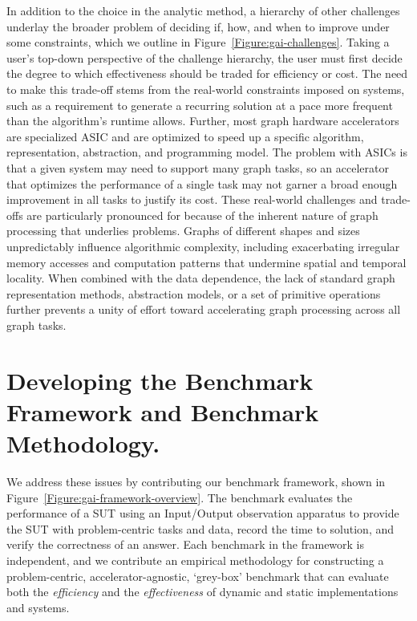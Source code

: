 In addition to the choice in the analytic method, a hierarchy of other challenges underlay the broader problem of deciding if, how, and when to improve \gai under some constraints, which we outline in Figure~\ref{Figure:gai-challenges}.
Taking a user's top-down perspective of the challenge hierarchy, the user must first decide the degree to which effectiveness should be traded for efficiency or cost.
The need to make this trade-off stems from the real-world constraints imposed on \gai systems, such as a requirement to generate a recurring solution at a pace more frequent than the algorithm's runtime allows.
Further, most graph hardware accelerators are specialized \ac{ASIC} and are optimized to speed up a specific algorithm, representation, abstraction, and programming model.
The problem with \ac{ASIC}s is that a given \gai system may need to support many graph tasks, so an accelerator that optimizes the performance of a single \gai task may not garner a broad enough improvement in all \gai tasks to justify its cost. 
These real-world challenges and trade-offs are particularly pronounced for \gai because of the inherent nature of graph processing that underlies \gai problems.
Graphs of different shapes and sizes unpredictably influence algorithmic complexity, including exacerbating irregular memory accesses and computation patterns that undermine spatial and temporal locality. 
When combined with the data dependence, the lack of standard graph representation methods, abstraction models, or a set of primitive operations further prevents a unity of effort toward accelerating graph processing across all graph tasks.




\section{Developing the \gai Benchmark Framework and \gai Benchmark Methodology.}
\label{section:graph-based-ai-problem-methodology}





We address these \gai issues by contributing our \gai benchmark framework, shown in Figure~\ref{Figure:gai-framework-overview}. 
The benchmark evaluates the performance of a \ac{SUT} using an Input/Output observation apparatus to provide the \ac{SUT} with problem-centric tasks and data, record the time to solution, and verify the correctness of an answer. 
Each \gai benchmark in the framework is independent, and we contribute an empirical methodology for constructing a problem-centric, accelerator-agnostic, `grey-box' \gai benchmark that can evaluate both the \textit{efficiency} and the \textit{effectiveness} of dynamic and static \gai implementations and systems.


